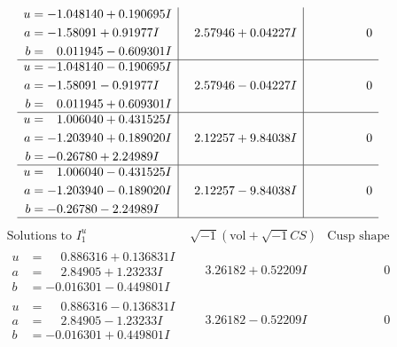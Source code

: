 \documentclass[1p]{elsarticle_modified}
\theoremstyle{definition}
\newcommand{\I}{\sqrt{-1}}
\begin{document}
$$\begin{array}{c|c|c}
\begin{aligned}
u &= -1.048140 + 0.190695 I \\
a &= -1.58091 + 0.91977 I \\
b &= \phantom{-}0.011945 - 0.609301 I\end{aligned}
 & \phantom{-}2.57946 + 0.04227 I & \phantom{-0.000000 } 0 \\ \hline\begin{aligned}
u &= -1.048140 - 0.190695 I \\
a &= -1.58091 - 0.91977 I \\
b &= \phantom{-}0.011945 + 0.609301 I\end{aligned}
 & \phantom{-}2.57946 - 0.04227 I & \phantom{-0.000000 } 0 \\ \hline\begin{aligned}
u &= \phantom{-}1.006040 + 0.431525 I \\
a &= -1.203940 + 0.189020 I \\
b &= -0.26780 + 2.24989 I\end{aligned}
 & \phantom{-}2.12257 + 9.84038 I & \phantom{-0.000000 } 0 \\ \hline\begin{aligned}
u &= \phantom{-}1.006040 - 0.431525 I \\
a &= -1.203940 - 0.189020 I \\
b &= -0.26780 - 2.24989 I\end{aligned}
 & \phantom{-}2.12257 - 9.84038 I & \phantom{-0.000000 } 0\\
 \hline 
 \end{array}$$\newpage$$\begin{array}{c|c|c}  
\text{Solutions to }I^u_{1}& \I (\text{vol} + \sqrt{-1}CS) & \text{Cusp shape}\\
 \hline 
\begin{aligned}
u &= \phantom{-}0.886316 + 0.136831 I \\
a &= \phantom{-}2.84905 + 1.23233 I \\
b &= -0.016301 - 0.449801 I\end{aligned}
 & \phantom{-}3.26182 + 0.52209 I & \phantom{-0.000000 } 0 \\ \hline\begin{aligned}
u &= \phantom{-}0.886316 - 0.136831 I \\
a &= \phantom{-}2.84905 - 1.23233 I \\
b &= -0.016301 + 0.449801 I\end{aligned}
 & \phantom{-}3.26182 - 0.52209 I & \phantom{-0.000000 } 0 \\ \hline\begin{aligned}

\end{aligned}
\end{array}$$
\end{document}
